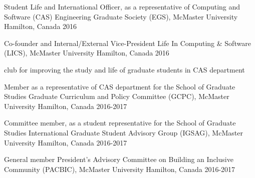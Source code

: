 

\begin{cventries}

  \cventry
    {Student Life and International Officer, as a representative of Computing and Software (CAS)} %
    {Engineering Graduate Society (EGS), McMaster University} %
    {Hamilton, Canada} %
    {2016} %
    {}

  \cventry
    {Co-founder and Internal/External Vice-President} %
    {Life In Computing \& Software (LICS), McMaster University} %
    {Hamilton, Canada} %
    {2016} %
    {
      \begin{cvitems} %
        \item {club for improving the study and life of graduate students in CAS department}
      \end{cvitems}
    }

\cventry
{Member as a representative of CAS department for the School of Graduate Studies} %
{Graduate Curriculum and Policy Committee (GCPC), McMaster University} %
{Hamilton, Canada} %
{2016-2017} %
{}

\cventry
{Committee member, as a student representative for the School of Graduate Studies} %
{International Graduate Student Advisory Group (IGSAG), McMaster University} %
{Hamilton, Canada} %
{2016-2017} %
{}

\cventry
{General member} %
{President’s Advisory Committee on Building an Inclusive Community (PACBIC), McMaster University} %
{Hamilton, Canada} %
{2016-2017} %
{}
\end{cventries}
